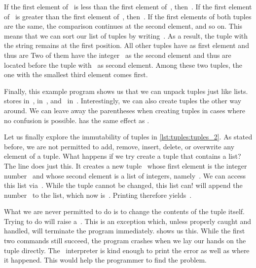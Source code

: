 If the first element of~ is less than the first element of~, then~.
If the first element of~ is greater than the first element of~, then~.
If the first elements of both tuples are the same, the comparison continues at the second element, and so on.
This means that we can sort our list of tuples by writing~.
As a result, the tuple with the string  remains at the first position.
All other tuples have  as first element and thus are 
Two of them have the integer~ as the second element and thus are located before the tuple with~ as second element.
Among these two tuples, the one with the smallest third element comes first.

Finally, this example program shows us that we can unpack tuples just like lists.
 stores  in~,  in~, and~ in~.
Interestingly, we can also create tuples the other way around.
We can leave away the parentheses when creating tuples in cases where no confusion is possible.
 has the same effect as .

Let us finally explore the immutability of tuples in \cref{lst:tuples:tuples_2}.
As stated before, we are not permitted to add, remove, insert, delete, or overwrite any element of a tuple.
What happens if we try create a tuple that contains a list?
The line  does just this.
It creates a new tuple~ whose first element is the integer number~ and whose second element is a list of integers, namely~\pythonil{[2]}.
We can access this list via~.
While the tuple cannot be changed, this list can!
 will append the number~ to the list, which now is~\pythonil{[2, 2]}.
Printing  therefore yields~.

What we are never permitted to do is to change the contents of the tuple itself.
Trying to do  will raise a~.
This is an exception which, unless properly caught and handled, will terminate the program immediately.
 shows us this.
While the first two  commands still succeed, the program crashes when we lay our hands on the tuple directly.
The \python\ interpreter is kind enough to print the error as well as where it happened.
This would help the programmer to find the problem.

